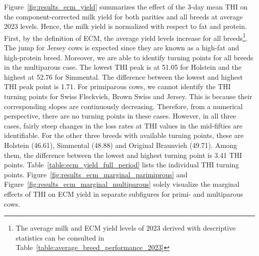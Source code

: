 Figure~\ref{fig:results_ecm_yield} summarizes the effect of the 3-day mean THI on the component-corrected milk yield for both parities and all breeds at average 2023 levels. Hence, the milk yield is normalized with respect to fat and protein. First, by the definition of ECM, the average yield levels increase for all breeds\footnote{The average milk and ECM yield levels of 2023 derived with descriptive statistics can be consulted in Table~\ref{table:average_breed_performance_2023}}. The jump for Jersey cows is expected since they are known as a high-fat and high-protein breed. Moreover, we are able to identify turning points for all breeds in the multiparous case. The lowest THI peak is at 51.05 for Holstein and the highest at 52.76 for Simmental. The difference between the lowest and highest THI peak point is 1.71. For primiparous cows, we cannot identify the THI turning points for Swiss Fleckvieh, Brown Swiss and Jersey. This is because their corresponding slopes are continuously decreasing. Therefore, from a numerical perspective, there are no turning points in these cases. However, in all three cases, fairly steep changes in the loss rates at THI values in the mid-fifties are identifiable. For the other three breeds with available turning points, these are Holstein (46.61), Simmental (48.88) and Original Braunvieh (49.71). Among them, the difference between the lowest and highest turning point is 3.41 THI points. Table~\ref{table:ecm_yield_full_period} lists the individual THI turning points. Figure~\ref{fig:results_ecm_marginal_parimiprous} and Figure~\ref{fig:results_ecm_marginal_multiparous} solely visualize the marginal effects of THI on ECM yield in separate subfigures for primi- and multiparous cows.

